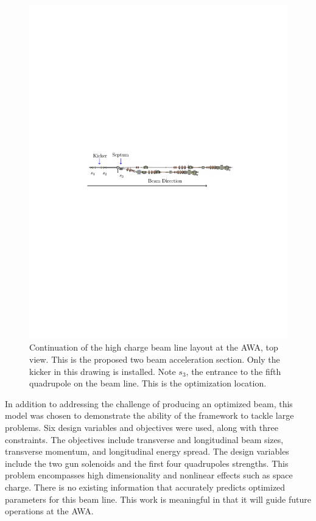 \begin{figure}
\includegraphics[width=0.9\linewidth]{figures/tba_dogleg2}
	\caption{Continuation of the high charge beam line layout at the AWA, top view. 
		This is the proposed two beam acceleration section. 
		Only the kicker in this drawing is installed. 
	Note $s_3$, the entrance to the fifth quadrupole on the beam line.
	This is the optimization location.}
	\label{awa-tba}
\end{figure}
%

In addition to addressing the challenge of producing an optimized beam, 
this model was chosen to demonstrate the ability of the framework to tackle large problems.
Six design variables and objectives were used, along with three constraints.
The objectives include transverse and longitudinal beam sizes, 
transverse momentum, and longitudinal energy spread. 
The design variables include the two gun solenoids and 
the first four quadrupoles strengths. 
This problem encompasses high dimensionality 
and nonlinear effects such as space charge. There is no existing information
that accurately predicts optimized parameters for this beam line. 
This work is meaningful in that it will guide future operations at the AWA.


